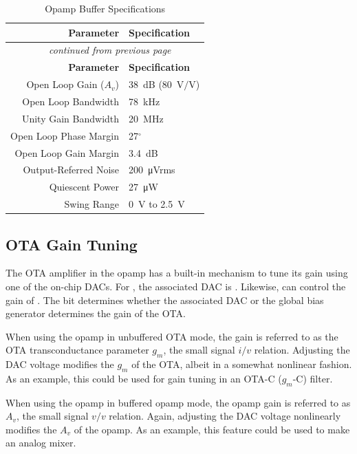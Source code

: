 \begin{longtable}[c]{ r l }
	\caption{Opamp Buffer Specifications} \label{t:opamp-buffer-specs} \\ \hline
	\textbf{Parameter} & \textbf{Specification} \\ \hline \endfirsthead

	\multicolumn{2}{c}{\textit{\tablename\ \thetable\ continued from previous page}} \\ \hline
	\textbf{Parameter} & \textbf{Specification} \\ \hline \endhead

	Open Loop Gain ($A_v$) & 38~dB (80~$\si{\volt}/\si{\volt}$) \\
	\rowcolor{tablehighlightcolor}
	Open Loop Bandwidth & 78~\si{\kilo\hertz} \\
	Unity Gain Bandwidth & 20~\si{\mega\hertz} \\
	\rowcolor{tablehighlightcolor}
	Open Loop Phase Margin & 27$^\circ$ \\
	Open Loop Gain Margin & 3.4~dB \\
	\rowcolor{tablehighlightcolor}
	Output-Referred Noise & 200~\si{\micro\volt}rms \\
	Quiescent Power & 27~\si{\micro\watt} \\
	\rowcolor{tablehighlightcolor}
	Swing Range & 0~\si{\volt} to 2.5~\si{\volt} \\
	\hline
\end{longtable}




\subsection{OTA Gain Tuning}

The OTA amplifier in the opamp has a built-in mechanism to tune its gain using one of the on-chip DACs. For , the associated DAC is . Likewise,  can control the gain of . The  bit determines whether the associated DAC or the global bias generator determines the gain of the OTA.

When using the opamp in unbuffered OTA mode, the gain is referred to as the OTA transconductance parameter $g_m$, the small signal $i/v$ relation. Adjusting the DAC voltage modifies the $g_m$ of the OTA, albeit in a somewhat nonlinear fashion. As an example, this could be used for gain tuning in an OTA-C ($g_m$-C) filter.

When using the opamp in buffered opamp mode, the opamp gain is referred to as $A_v$, the small signal $v/v$ relation. Again, adjusting the DAC voltage nonlinearly modifies the $A_v$ of the opamp. As an example, this feature could be used to make an analog mixer.



